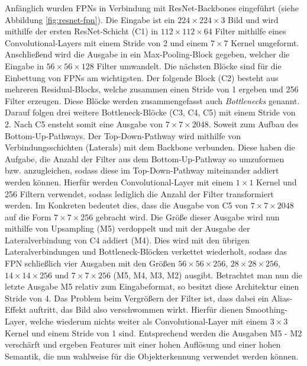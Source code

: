 Anfänglich wurden FPNs in Verbindung mit ResNet-Backbones eingeführt (siehe
Abbildung \ref{fig:resnet-fpn}). Die Eingabe ist ein $224 \times 224 \times 3$
Bild und wird mithilfe der ersten ResNet-Schicht (C1) in $112 \times 112 \times
64$ Filter mithilfe eines Convolutional-Layers mit einem Stride von 2 und einem
$7 \times 7$ Kernel umgeformt. Anschließend wird die Ausgabe in ein
Max-Pooling-Block gegeben, welcher die Eingabe in $56 \times 56 \times 128$
Filter umwandelt. Die nächsten Blöcke sind für die Einbettung von FPNs am
wichtigsten. Der folgende Block (C2) besteht aus mehreren Residual-Blocks,
welche zusammen einen Stride von 1 ergeben und 256 Filter erzeugen. Diese Blöcke
werden zusammengefasst auch \textit{Bottlenecks} genannt. Darauf folgen drei
weitere Bottleneck-Blöcke (C3, C4, C5) mit einem Stride von 2. Nach C5 ensteht
somit eine Ausgabe von $7 \times 7 \times 2048$. Soweit zum Aufbau des
Bottom-Up-Pathways. Der Top-Down-Pathway wird mithilfe von Verbindungsschichten
(Laterals) mit dem Backbone verbunden. Diese haben die Aufgabe, die Anzahl der
Filter aus dem Bottom-Up-Pathway so umzuformen bzw. anzugleichen, sodass diese
im Top-Down-Pathway miteinander addiert werden können. Hierfür werden
Convolutional-Layer mit einem $1 \times 1$ Kernel und 256 Filtern verwendet,
sodass lediglich die Anzahl der Filter transformiert werden. Im Konkreten
bedeutet dies, dass die Ausgabe von C5 von $7 \times 7 \times 2048$ auf die Form
$7 \times 7 \times 256$ gebracht wird.  Die Größe dieser Ausgabe wird nun
mithilfe von Upsampling (M5) verdoppelt und mit der Ausgabe der
Lateralverbindung von C4 addiert (M4). Dies wird mit den übrigen
Lateralverbindungen und Bottleneck-Blöcken verkettet wiederholt, sodass das FPN
schließlich vier Ausgaben mit den Größen $56 \times 56 \times 256$, $28 \times
28 \times 256$, $14 \times 14 \times 256$ und $7 \times 7 \times 256$ (M5, M4,
M3, M2) ausgibt. Betrachtet man nun die letzte Ausgabe M5 relativ zum
Eingabeformat, so besitzt diese Architektur einen Stride von 4. Das Problem beim
Vergrößern der Filter ist, dass dabei ein Alias-Effekt auftritt, das Bild also
verschwommen wirkt. Hierfür dienen Smoothing-Layer, welche wiederum nichts
weiter als Convolutional-Layer mit einem $3 \times 3$ Kernel und einem Stride
von 1 sind. Entsprechend werden die Ausgaben M5 - M2 verschärft und ergeben
Features mit einer hohen Auflösung und einer hohen Semantik, die nun wahlweise
für die Objekterkennung verwendet werden können.

